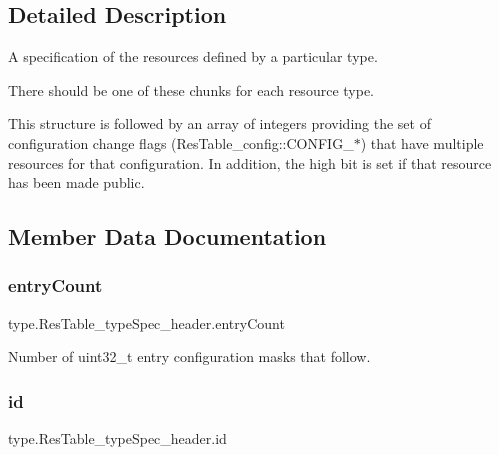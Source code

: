 \subsection{Detailed Description}
A specification of the resources defined by a particular type. 

There should be one of these chunks for each resource type.

This structure is followed by an array of integers providing the set of configuration change flags (Res\+Table\+\_\+config\+::\+C\+O\+N\+F\+I\+G\+\_\+$\ast$) that have multiple resources for that configuration. In addition, the high bit is set if that resource has been made public. 

\subsection{Member Data Documentation}
\mbox{\label{classtype_1_1ResTable__typeSpec__header_ac508f83ab6f145fe79f7f527b8924567}} 
\subsubsection{\texorpdfstring{entry\+Count}{entryCount}}
{\footnotesize\ttfamily type.\+Res\+Table\+\_\+type\+Spec\+\_\+header.\+entry\+Count}



Number of uint32\+\_\+t entry configuration masks that follow. 

\mbox{\label{classtype_1_1ResTable__typeSpec__header_aad59ee5d1b955fa94928d17fd38ce69e}} 
\subsubsection{\texorpdfstring{id}{id}}
{\footnotesize\ttfamily type.\+Res\+Table\+\_\+type\+Spec\+\_\+header.\+id}



